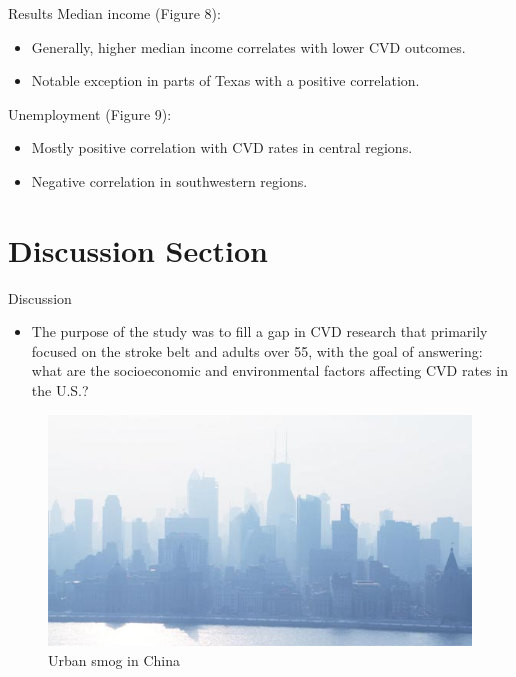 \documentclass[
  ignorenonframetext,
]{beamer}
\providecommand{\tightlist}{%
  \setlength{\itemsep}{0pt}\setlength{\parskip}{0pt}}\usepackage{longtable,booktabs,array}
\begin{document}
\begin{frame}{Results}
\label{results-5}
Median income (Figure 8):

\begin{itemize}
\item
  Generally, higher median income correlates with lower CVD outcomes.
\item
  Notable exception in parts of Texas with a positive correlation.
\end{itemize}

Unemployment (Figure 9):

\begin{itemize}
\item
  Mostly positive correlation with CVD rates in central regions.
\item
  Negative correlation in southwestern regions.
\end{itemize}
\end{frame}

\section{Discussion Section}\label{discussion-section}

\begin{frame}{Discussion}
\label{discussion}
\begin{itemize}
\tightlist
\item
  The purpose of the study was to fill a gap in CVD research that
  primarily focused on the stroke belt and adults over 55, with the goal
  of answering: what are the socioeconomic and environmental factors
  affecting CVD rates in the U.S.?
\end{itemize}

\begin{figure}[H]

{\centering \includegraphics{PresentationPhotos/urbanPollution.jpg}

}

\caption{Urban smog in China}

\end{figure}%
\end{frame}
\end{document}
